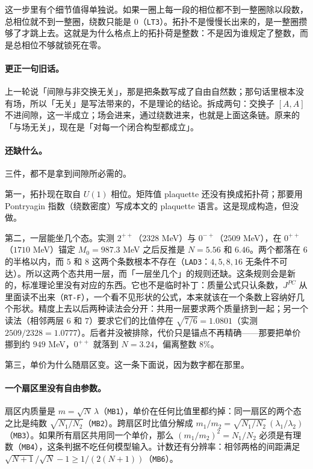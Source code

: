 \documentclass[aps,prd,preprint,superscriptaddress,amsmath,amssymb]{revtex4-2}
\begin{document}
这一步里有个细节值得单独说。如果一圈上每一段的相位都不到一整圈除以段数，总相位就不到一整圈，绕数只能是 $0$（\texttt{LT3}）。拓扑不是慢慢长出来的，是一整圈攒够了才跳上去。这就是为什么格点上的拓扑荷是整数：不是因为谁规定了整数，而是总相位不够就锁死在零。

\paragraph{更正一句旧话。}
上一轮说「间隙与非交换无关」，那是把条数写成了自由自然数；那句话里根本没有场，所以「无关」是写法带来的，不是理论的结论。拆成两句：交换子 $[A,A]$ 不进间隙，这一半成立；场会进来，通过绕数进来，也就是上面这条链。原来的「与场无关」，现在是「对每一个闭合构型都成立」。

\paragraph{还缺什么。}
三件，都不是拿到间隙所必需的。

第一，拓扑现在取自 $U(1)$ 相位。矩阵值 plaquette 还没有换成拓扑荷；那要用 Pontryagin 指数（绕数密度）写成本文的 plaquette 语言。这是现成构造，但没做。

第二，一层能坐几个态。实测 $2^{++}$（$2328$ MeV）与 $0^{-+}$（$2509$ MeV），在 $0^{++}$（$1710$ MeV）锚定 $M_0=987.3$ MeV 之后反推是 $N=5.56$ 和 $6.46$。两个都落在 $6$ 的半格以内，而 $5$ 和 $8$ 这两个条数根本不存在（\texttt{LAD3}：$4,5,8,16$ 无条件不可达）。所以这两个态共用一层，而「一层坐几个」的规则还缺。这条规则会是新的，标准理论里没有对应的东西。它也不是临时补丁：质量公式只认条数，$J^{PC}$ 从里面读不出来（\texttt{RT-F}），一个看不见形状的公式，本来就该在一个条数上容纳好几个形状。精度上去以后两种读法会分开：共用一层要求两个质量挤到一起；另一个读法（相邻两层 $6$ 和 $7$）要求它们的比值停在 $\sqrt{7/6}=1.0801$（实测 $2509/2328=1.0777$）。后者并没被排除，代价只是锚点不再精确——那要把单价挪到约 $949$ MeV，$0^{++}$ 就落到 $N=3.24$，偏离整数 $8\%$。

第三，单价为什么随扇区变。这一条下面说，因为数字都在那里。

\paragraph{一个扇区里没有自由参数。}
扇区内质量是 $m=\sqrt N\,\lambda$（\texttt{MB1}），单价在任何比值里都约掉：同一扇区的两个态之比是纯数 $\sqrt{N_1/N_2}$（\texttt{MB2}）。跨扇区时比值分解成 $m_1/m_2=\sqrt{N_1/N_2}\,(\lambda_1/\lambda_2)$（\texttt{MB3}）。如果所有扇区共用同一个单价，那么 $(m_1/m_2)^2=N_1/N_2$ 必须是有理数（\texttt{MB4}），这条判据不吃任何模型输入。计数还有分辨率：相邻两格的间距满足 $\sqrt{N+1}/\sqrt N-1\ge 1/(2(N+1))$（\texttt{MB6}）。
\end{document}
